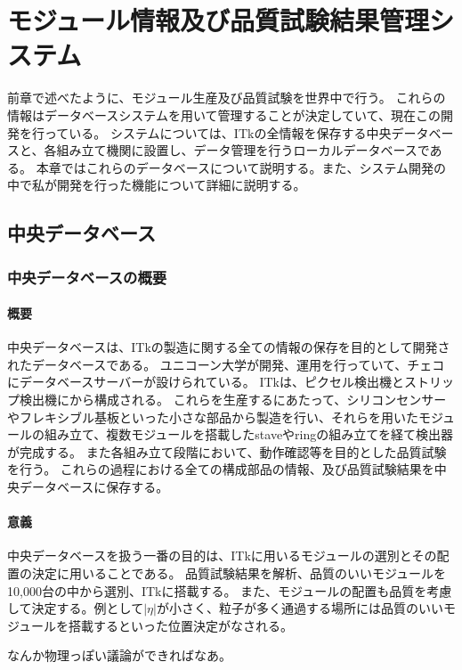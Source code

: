 \chapter{モジュール情報及び品質試験結果管理システム}
前章で述べたように、モジュール生産及び品質試験を世界中で行う。
これらの情報はデータベースシステムを用いて管理することが決定していて、現在この開発を行っている。
システムについては、ITkの全情報を保存する中央データベースと、各組み立て機関に設置し、データ管理を行うローカルデータベースである。
本章ではこれらのデータベースについて説明する。また、システム開発の中で私が開発を行った機能について詳細に説明する。

\section{中央データベース}
\subsection{中央データベースの概要}
\subsubsection{概要}
中央データベースは、ITkの製造に関する全ての情報の保存を目的として開発されたデータベースである。
ユニコーン大学が開発、運用を行っていて、チェコにデータベースサーバーが設けられている。
ITkは、ピクセル検出機とストリップ検出機にから構成される。
これらを生産するにあたって、シリコンセンサーやフレキシブル基板といった小さな部品から製造を行い、それらを用いたモジュールの組み立て、複数モジュールを搭載したstaveやringの組み立てを経て検出器が完成する。
また各組み立て段階において、動作確認等を目的とした品質試験を行う。
これらの過程における全ての構成部品の情報、及び品質試験結果を中央データベースに保存する。

\subsubsection{意義}
中央データベースを扱う一番の目的は、ITkに用いるモジュールの選別とその配置の決定に用いることである。
品質試験結果を解析、品質のいいモジュールを10,000台の中から選別、ITkに搭載する。
また、モジュールの配置も品質を考慮して決定する。例として$|\eta|$が小さく、粒子が多く通過する場所には品質のいいモジュールを搭載するといった位置決定がなされる。

なんか物理っぽい議論ができればなあ。


